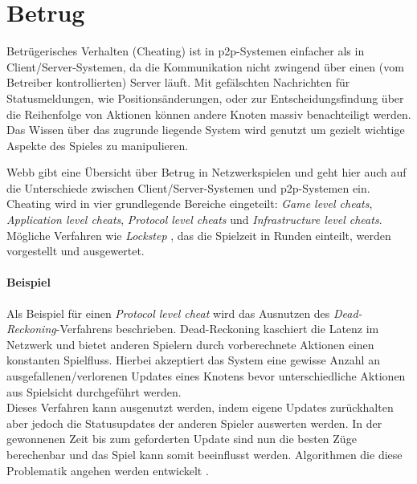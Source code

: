 \section{Betrug}
\label{chap:grundlagen:cheating}
Betrügerisches Verhalten (Cheating) ist in p2p-Systemen einfacher als in Client/Server-Systemen, da die Kommunikation nicht zwingend über einen (vom Betreiber kontrollierten) Server läuft. Mit gefälschten Nachrichten für Statusmeldungen, wie Positionsänderungen, oder zur Entscheidungsfindung über die Reihenfolge von Aktionen können andere Knoten massiv benachteiligt werden. Das Wissen über das zugrunde liegende System wird genutzt um gezielt wichtige Aspekte des Spieles zu manipulieren.

Webb \cite{Webb2007Cheating} gibt eine Übersicht über Betrug in Netzwerkspielen und geht hier auch auf die Unterschiede zwischen Client/Server-Systemen und p2p-Systemen ein. Cheating wird in vier grundlegende Bereiche eingeteilt: \emph{Game level cheats}, \emph{Application level cheats}, \emph{Protocol level cheats} und \emph{Infrastructure level cheats}. Mögliche Verfahren wie \emph{Lockstep} \cite{Baughman2007}, das die Spielzeit in Runden einteilt, werden vorgestellt und ausgewertet.

\paragraph{Beispiel}
Als Beispiel für einen \emph{Protocol level cheat} wird das Ausnutzen des \emph{Dead-Reckoning}-Verfahrens \cite{Pantel2002} beschrieben. Dead-Reckoning kaschiert die Latenz im Netzwerk und bietet anderen Spielern durch vorberechnete Aktionen einen konstanten Spielfluss. Hierbei akzeptiert das System eine gewisse Anzahl an ausgefallenen/verlorenen Updates eines Knotens bevor unterschiedliche Aktionen aus Spielsicht durchgeführt werden.\\
Dieses Verfahren kann ausgenutzt werden, indem eigene Updates zurückhalten aber jedoch die Statusupdates der anderen Spieler auswerten werden. In der gewonnenen Zeit bis zum geforderten Update sind nun die besten Züge berechenbar und das Spiel kann somit beeinflusst werden. Algorithmen die diese Problematik angehen werden entwickelt \cite{Aggarwal2005}.

